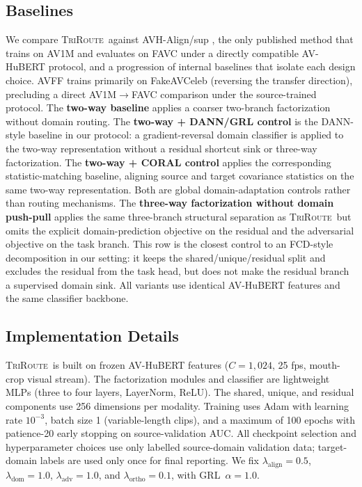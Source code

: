 \documentclass{article}
\newcommand{\method}{\textsc{TriRoute}}
\begin{document}
\subsection{Baselines}

We compare \method\ against AVH-Align/sup \citep{smeu2025avhalign}, the only published method that trains on AV1M and evaluates on FAVC under a directly compatible AV-HuBERT protocol, and a progression of internal baselines that isolate each design choice. AVFF \citep{oorloff2024avff} trains primarily on FakeAVCeleb (reversing the transfer direction), precluding a direct AV1M$\to$FAVC comparison under the source-trained protocol. The \textbf{two-way baseline} applies a coarser two-branch factorization without domain routing. The \textbf{two-way + DANN/GRL control} is the DANN-style baseline in our protocol: a gradient-reversal domain classifier is applied to the two-way representation without a residual shortcut sink or three-way factorization. The \textbf{two-way + CORAL control} applies the corresponding statistic-matching baseline, aligning source and target covariance statistics on the same two-way representation. Both are global domain-adaptation controls rather than routing mechanisms. The \textbf{three-way factorization without domain push-pull} applies the same three-branch structural separation as \method\ but omits the explicit domain-prediction objective on the residual and the adversarial objective on the task branch. This row is the closest control to an FCD-style decomposition in our setting: it keeps the shared/unique/residual split and excludes the residual from the task head, but does not make the residual branch a supervised domain sink. All variants use identical AV-HuBERT features and the same classifier backbone.

\subsection{Implementation Details}

\method\ is built on frozen AV-HuBERT \citep{shi2022avhubert} features ($C=1{,}024$, 25 fps, mouth-crop visual stream). The factorization modules and classifier are lightweight MLPs (three to four layers, LayerNorm, ReLU). The shared, unique, and residual components use 256 dimensions per modality. Training uses Adam with learning rate $10^{-3}$, batch size 1 (variable-length clips), and a maximum of 100 epochs with patience-20 early stopping on source-validation AUC. All checkpoint selection and hyperparameter choices use only labelled source-domain validation data; target-domain labels are used only once for final reporting. We fix $\lambda_{\mathrm{align}} = 0.5$, $\lambda_{\mathrm{dom}} = 1.0$, $\lambda_{\mathrm{adv}} = 1.0$, and $\lambda_{\mathrm{ortho}} = 0.1$, with GRL~$\alpha = 1.0$.
\end{document}
